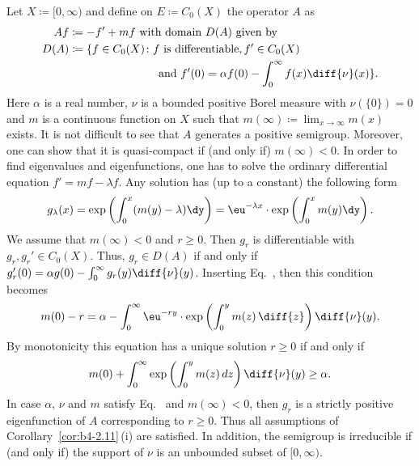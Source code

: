 \begin{example}\label{ex:b4-2.12}
	Let $X  \coloneq  [0,\infty)$ and define on $E  \coloneq  C_{0}(X)$ the operator $A$ as
	\begin{equation}\label{eq:b4-2.8}
		\begin{aligned}
		Af & \coloneq -f' + mf \text{ with domain } D(A) \text{ given by}	\\
		D(A) & \coloneq  \{f \in C_{0}(X) \colon f \text{ is differentiable}, f' \in C_{0}(X)\\
		& \phantom{aaaaaaaaaaaaaaa} \text{and } f'(0) = \alpha f(0) - \int_0^{\infty} f(x) \diff{\nu}(x)
 \} \text{.}
		\end{aligned}
	\end{equation}
Here $\alpha$ is a real number, $\nu$ is a bounded positive Borel measure with $\nu(\{0\}) = 0$ and $m$ is a continuous function on $X$ such that $m(\infty)  \coloneq  \lim_{x \to \infty}m(x)$ exists. 
It is not difficult to see that $A$ generates a positive semigroup. 
Moreover, one can show that it is quasi-compact if (and only if) $m(\infty) < 0$. 
In order to find eigenvalues and eigenfunctions, one has to solve the ordinary differential equation $f' = mf - \lambda f$. 
Any solution has (up to a constant) the following form
\begin{equation}\label{eq:b4-2.9}
	g_{\lambda}(x) = \exp\left(\int_0^x(m(y) - \lambda)\dy \right) = \eu^{-\lambda x} \cdot \exp\left(\int_0^x m(y) \dy \right) .
\end{equation}
We assume that $m(\infty) < 0$ and $r \geq 0$. 
Then $g_r$ is differentiable with $g_r, g_r' \in C_{0}(X)$. 
Thus, $g_r \in D(A)$ if and only if\/ $g_r'(0) = \alpha g(0) - \int_0^{\infty} g_r(y) \diff{\nu}(y)$. 
Inserting Eq.~, then this condition becomes
\[
m(0) - r = \alpha - \int_0^{\infty} \eu^{-ry} \cdot \exp\left(\int_{0}^{y}  m(z) \,\diff{z}\right)\diff{\nu}(y) .
\]
By monotonicity this equation has a unique solution $r \geq 0$ if and only if
\begin{equation}\label{eq:b4-2.10}
	m(0) + \int_0^{\infty} \exp\left(\int_0^y m(z) \, dz\right)\diff{\nu}(y) \geq \alpha .
\end{equation}
In case $\alpha$, $\nu$ and $m$ satisfy Eq.~ and $m(\infty) < 0$, then $g_r$ is a strictly positive eigenfunction of\/ $A$ corresponding to $r \geq 0$. 
Thus all assumptions of Corollary~\ref{cor:b4-2.11}\,(i) are satisfied. 
In addition, the semigroup is irreducible if (and only if) the support of\/ $\nu$ is an unbounded subset of\/ $[0,\infty)$.
\end{example}

